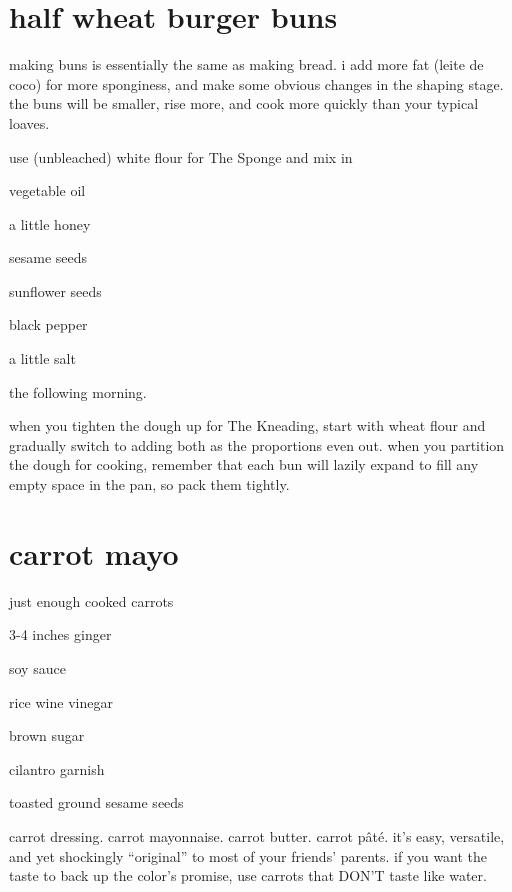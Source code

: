 \section{half wheat burger buns}

making buns is essentially the same as making bread. i add more fat (leite de 
coco) for more sponginess, and make some obvious changes in the shaping stage. 
the buns will be smaller, rise more, and cook more quickly than your typical 
loaves.

use (unbleached) white flour for The Sponge and mix in

\begin{ingredients}
  \item vegetable oil
  \item a little honey
  \item sesame seeds
  \item sunflower seeds
  \item black pepper
  \item a little salt
\end{ingredients}

the following morning.

when you tighten the dough up for The Kneading, start with wheat flour and 
gradually switch to adding both as the proportions even out.
when you partition the dough for cooking, remember that each bun will lazily 
expand to fill any empty space in the pan, so pack them tightly.

\section{carrot mayo}

\begin{ingredients}
  \item just enough cooked carrots
  \item 3-4 inches ginger
  \item soy sauce
  \item rice wine vinegar
  \item brown sugar
  \item cilantro garnish
  \item toasted ground sesame seeds
\end{ingredients}

carrot dressing. carrot mayonnaise. carrot butter. carrot p\^{a}t\'{e}. it's 
easy, versatile, and yet shockingly ``original'' to most of your friends' 
parents. if you want the taste to back up the color's promise, use carrots 
that DON'T taste like water.

